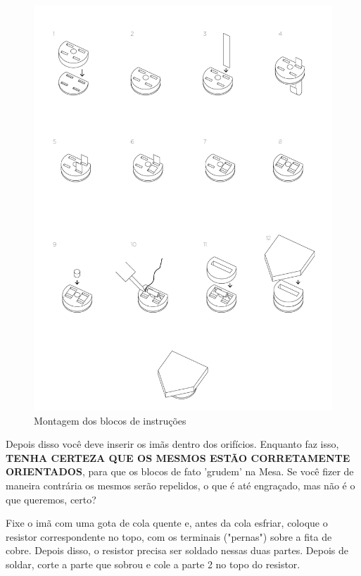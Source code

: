 \documentclass[paper=a4, fontsize=11pt]{scrartcl} %
\numberwithin{equation}{section} %
\numberwithin{figure}{section} %
\numberwithin{table}{section} %
\begin{document}
\begin{figure}[H] %
  \centering
  \includegraphics[scale=0.15]{./imagens/instruction-block-guide.jpg}
  \caption[ ]{Montagem dos blocos de instruções }
  \label{fig:bloco montagem}
\end{figure}

Depois disso você deve inserir os imãs dentro dos orifícios. Enquanto faz isso, \textbf{TENHA CERTEZA QUE OS MESMOS ESTÃO CORRETAMENTE ORIENTADOS}, para que os blocos de fato ’grudem’ na Mesa. Se você fizer de maneira contrária os mesmos serão repelidos, o que é até engraçado, mas não é o que queremos, certo?

Fixe o imã com uma gota de cola quente e, antes da cola esfriar, coloque o resistor correspondente no topo, com os terminais ("pernas") sobre a fita de cobre. Depois disso, o resistor precisa ser soldado nessas duas partes. Depois de soldar, corte a parte que sobrou e cole a parte 2 no topo do resistor.
\end{document}
